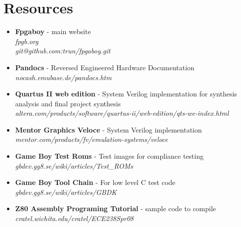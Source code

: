 \section{Resources}
\begin{itemize}
    \item {\bf Fpgaboy}
            - main website\\
            {\it fpgb.org} \\
            {\it git@github.com:trun/fpgaboy.git}
    \item {\bf Pandocs} - Reversed Engineered Hardware Documentation\\ 
            {\it nocash.emubase.de/pandocs.htm}
    \item {\bf Quartus II web edition} - System Verilog implementation 
             for synthesis analysis and final project synthesis\\
            {\it altera.com/products/software/quartus-ii/web-edition/qts-we-index.html}
    \item {\bf Mentor Graphics Veloce} - System Verilog implementation\\
            {\it mentor.com/products/fv/emulation-systems/veloce}
    \item {\bf Game Boy Test Roms}     - Test images for compliance testing\\
           {\it gbdev.gg8.se/wiki/articles/Test\_ROMs}
    \item {\bf Game Boy Tool Chain} - For low level C test code \\
           {\it gbdev.gg8.se/wiki/articles/GBDK}
    \item {\bf Z80 Assembly Programing Tutorial} - sample code to compile\\
           {\it cratel.wichita.edu/cratel/ECE238Spr08}
\end{itemize}

